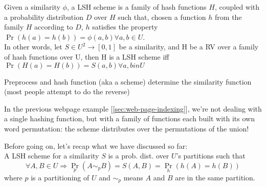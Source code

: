 	
	
	
	\obs Given a similarity $\phi$, a LSH scheme is a family of hash functions $H$, coupled with a probability distribution $D$ over $H$ such that, chosen a function $h$ from the family $H$ according to $D$, $h$ satisfies the property $\Pr(h(a)=h(b)) = \phi(a,b) \forall a,b \in U$. \\
	In other words, let $S \in U^2 \to [0, 1]$ be a similarity, and H be a RV over a family of hash functions over U, then H is a LSH scheme iff $\Pr(H(a)=H(b)) = S(a,b) \forall a,b in U$
	
	
	
	
	
	
	\obs Preprocess and hash function (aka a scheme) determine the similarity function (most people attempt to do the reverse)
	
	\obs In the previous webpage example [\ref{sec:web-page-indexing}], we're not dealing with a single hashing function, but with a family of functions each built with its own word permutation: the scheme distributes over the permutations of the union!
	
	
	Before going on, let's recap what we have discussed so far: \\
	A LSH scheme for a similarity $S$ is a prob. dist. over $U$'s partitions such that 
	\begin{equation}
		\forall A, B \in  U \Rightarrow \Pr_p(A\sim_p B) = S(A, B) = \Pr_h(h(A)=h(B))
	\end{equation}
	where $p$ is a partitioning of $U$ and $\sim_p$ means $A$ and $B$ are in the same partition.
	
